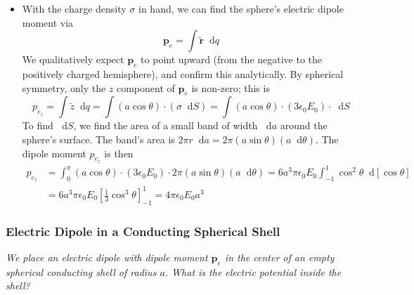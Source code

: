 \documentclass[11pt, a4paper]{article}
\newcommand{\diff}{\mathop{}\!\mathrm{d}} %
\renewcommand{\vec}[1]{\bm{#1}} %
\newcommand{\tvec}[1]{\tilde{\vec{#1}}} %
\newcommand{\e}{\epsilon_{0}} %
\newcommand{\pe}{\vec{p}_{e}} %
\begin{document}
\begin{itemize}
	\item With the charge density $ \sigma $ in hand, we can find the sphere's electric dipole moment via
	\begin{equation*}
		\vec{p}_{e} = \int \tvec{r} \diff q
	\end{equation*}
	We qualitatively expect $ \vec{p}_{e} $ to point upward (from the negative to the positively charged hemisphere), and confirm this analytically. By spherical symmetry, only the $ z $ component of $ \vec{p}_{e} $ is non-zero; this is
	\begin{equation*}
		p_{e_{z}} = \int \tilde{z} \diff q = \int (a \cos \theta) \cdot (\sigma \diff S) = \int( a \cos \theta) \cdot (3 \e E_{0}) \cdot \diff S
	\end{equation*}
	To find $ \diff S $, we find the area of a small band of width $ \diff a $ around the sphere's surface. The band's area is $ 2\pi r \diff a = 2\pi (a \sin \theta ) (a \diff \theta) $. The dipole moment $ p_{e_{z}} $ is then
	\begin{align*}
		p_{e_{z}} &= \int_{0}^{\pi}( a \cos \theta) \cdot (3 \e E_{0}) \cdot 2\pi (a \sin \theta ) (a \diff \theta) = 6a^{3}\pi \e E_{0} \int_{-1}^{1}\cos^{2}\theta \diff [\cos \theta]\\
		& = 6a^{3}\pi \e E_{0} \left[\frac{1}{3}\cos^{3}\theta \right]_{-1}^{1} = 4\pi \e E_{0} a^{3}
	\end{align*}
\end{itemize}

\subsubsection{Electric Dipole in a Conducting Spherical Shell}
\textit{We place an electric dipole with dipole moment $ \pe $ in the center of an empty spherical conducting shell of radius $ a $. What is the electric potential inside the shell?}
\end{document}
